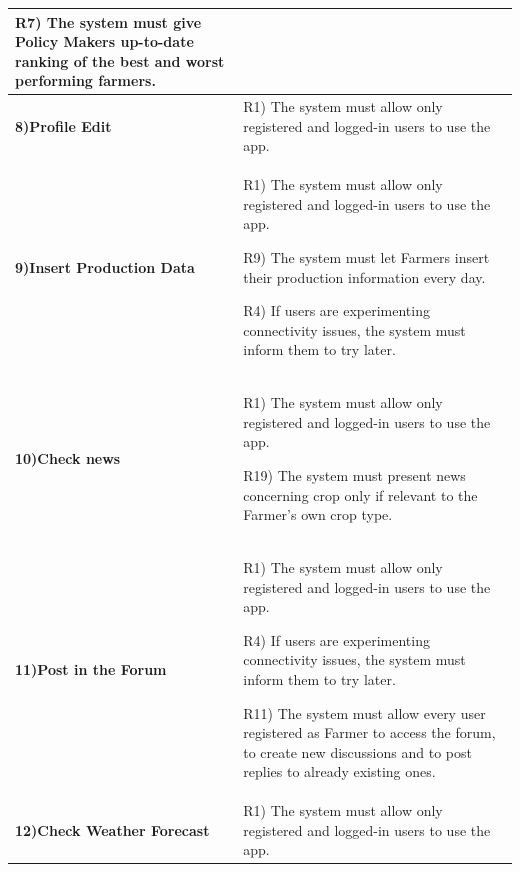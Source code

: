 \documentclass[table, 12pt]{article}
\begin{document}
\begin{itemize}
\begin{longtable}{|p{}|p{}|}
                                                                                           R7) The system must give Policy Makers up-to-date ranking of the best and worst performing farmers.\\\hline
                    \cellcolor{SpringGreen!50}\textbf{8)Profile Edit}\centering &  R1) The system must allow only registered and logged-in users to use the app.\\\hline
                                
                    \cellcolor{SpringGreen!50}\textbf{9)Insert Production Data}\centering & R1) The system must allow only registered and logged-in users to use the app.

                                                                                  R9) The system must let Farmers insert their production information every day.
                                                                                  
                                                                                  R4) If users are experimenting connectivity issues, the system must inform them to try later.\\\hline
                    \cellcolor{SpringGreen!50}\textbf{10)Check news}\centering &  R1) The system must allow only registered and logged-in users to use the app.
                                                                       
                                                                                 R19) The system must present news concerning crop only if relevant to the Farmer's own crop type.\\\hline
                    \cellcolor{SpringGreen!50}\textbf{11)Post in the Forum}\centering &  R1) The system must allow only registered and logged-in users to use the app.
                    
                                                                               R4) If users are experimenting connectivity issues, the system must inform them to try later.
                                                                               
                                                                               R11) The system must allow every user registered as Farmer to access the forum, to create new discussions and to post replies to already existing ones.\\\hline
                    \cellcolor{SpringGreen!50}\textbf{12)Check Weather Forecast}\centering &  R1) The system must allow only registered and logged-in users to use the app.
                    

\end{longtable}
\end{itemize}
\end{document}
